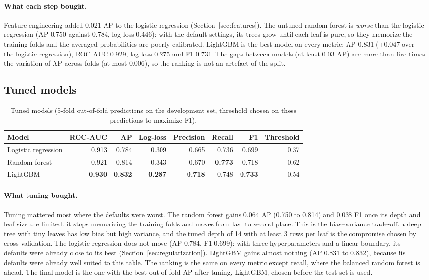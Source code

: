 \paragraph{What each step bought.} Feature engineering added 0.021 AP to the
logistic regression (Section~\ref{sec:features}). The untuned random forest is
\emph{worse} than the logistic regression (AP 0.750 against 0.784, log-loss
0.446): with the default settings, its trees grow until each leaf is pure, so
they memorize the training folds and the averaged probabilities are poorly
calibrated. LightGBM is the best model on every metric: AP 0.831 (+0.047 over
the logistic regression), ROC-AUC 0.929, log-loss 0.275 and F1 0.731. The gaps
between models (at least 0.03 AP) are more than five times the variation of AP
across folds (at most 0.006), so the ranking is not an artefact of the split.

\subsection{Tuned models}

\begin{table}[H]
\centering
\caption{Tuned models (5-fold out-of-fold predictions on the development set,
threshold chosen on these predictions to maximize F1).}
\label{tab:models-tuned}
\small
\setlength{\tabcolsep}{4pt}
\begin{tabular}{lrrrrrrr}
\toprule
Model & ROC-AUC & AP & Log-loss & Precision & Recall & F1 & Threshold \\
\midrule
Logistic regression & 0.913 & 0.784 & 0.309 & 0.665 & 0.736 & 0.699 & 0.37 \\
Random forest       & 0.921 & 0.814 & 0.343 & 0.670 & \textbf{0.773} & 0.718 & 0.62 \\
LightGBM            & \textbf{0.930} & \textbf{0.832} & \textbf{0.287} & \textbf{0.718} & 0.748 & \textbf{0.733} & 0.54 \\
\bottomrule
\end{tabular}
\end{table}

\paragraph{What tuning bought.} Tuning mattered most where the defaults were
worst. The random forest gains 0.064 AP (0.750 to 0.814) and 0.038 F1 once its
depth and leaf size are limited: it stops memorizing the training folds and
moves from last to second place. This is the bias--variance trade-off: a deep
tree with tiny leaves has low bias but high variance, and the tuned depth of 14
with at least 3 rows per leaf is the compromise chosen by cross-validation. The
logistic regression does not move (AP 0.784, F1 0.699): with three
hyperparameters and a linear boundary, its defaults were already close to its
best (Section~\ref{sec:regularization}). LightGBM gains almost nothing (AP
0.831 to 0.832), because its defaults were already well suited to this table.
The ranking is the same on every metric except recall, where the balanced
random forest is ahead. The final model is the one with the best out-of-fold AP
after tuning, LightGBM, chosen before the test set is used.
